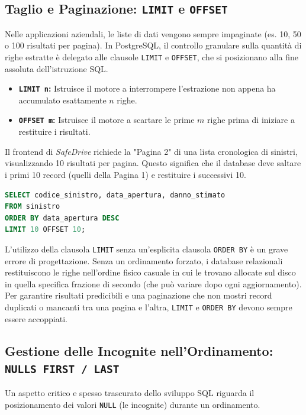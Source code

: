 \subsection{Taglio e Paginazione: \texttt{LIMIT} e \texttt{OFFSET}}
Nelle applicazioni aziendali, le liste di dati vengono sempre impaginate (es. 10, 50 o 100 risultati per pagina). In PostgreSQL, il controllo granulare sulla quantità di righe estratte è delegato alle clausole \texttt{LIMIT} e \texttt{OFFSET}, che si posizionano alla fine assoluta dell'istruzione SQL.

\begin{itemize}
    \item \textbf{\texttt{LIMIT n}:} Istruisce il motore a interrompere l'estrazione non appena ha accumulato esattamente $n$ righe.
    \item \textbf{\texttt{OFFSET m}:} Istruisce il motore a scartare le prime $m$ righe prima di iniziare a restituire i risultati.
\end{itemize}

\begin{example}
Il frontend di \textit{SafeDrive} richiede la "Pagina 2" di una lista cronologica di sinistri, visualizzando 10 risultati per pagina. Questo significa che il database deve saltare i primi 10 record (quelli della Pagina 1) e restituire i successivi 10.

\begin{lstlisting}[language=SQL, basicstyle=\ttfamily\small, keywordstyle=\color{blue}\bfseries]
SELECT codice_sinistro, data_apertura, danno_stimato
FROM sinistro
ORDER BY data_apertura DESC
LIMIT 10 OFFSET 10;
\end{lstlisting}
\end{example}

\begin{observation}
L'utilizzo della clausola \texttt{LIMIT} senza un'esplicita clausola \texttt{ORDER BY} è un grave errore di progettazione. Senza un ordinamento forzato, i database relazionali restituiscono le righe nell'ordine fisico casuale in cui le trovano allocate sul disco in quella specifica frazione di secondo (che può variare dopo ogni aggiornamento). Per garantire risultati predicibili e una paginazione che non mostri record duplicati o mancanti tra una pagina e l'altra, \texttt{LIMIT} e \texttt{ORDER BY} devono sempre essere accoppiati.
\end{observation}

\subsection{Gestione delle Incognite nell'Ordinamento: \texttt{NULLS FIRST / LAST}}
Un aspetto critico e spesso trascurato dello sviluppo SQL riguarda il posizionamento dei valori \texttt{NULL} (le incognite) durante un ordinamento.

